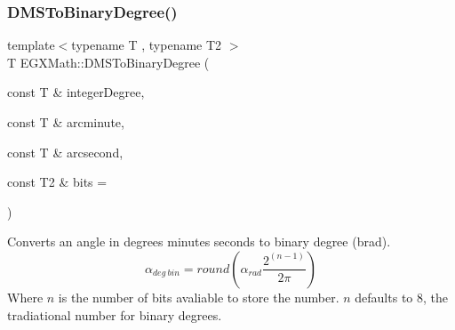 \mbox{\label{group___e_g_x_math-_angle_conversions-_d_m_s_gae0b9627dc69707dd6febb80306318d9a}} 
\subsubsection{\texorpdfstring{D\+M\+S\+To\+Binary\+Degree()}{DMSToBinaryDegree()}}
{\footnotesize\ttfamily template$<$typename T , typename T2 $>$ \\
T E\+G\+X\+Math\+::\+D\+M\+S\+To\+Binary\+Degree (\begin{DoxyParamCaption}\item[{const T \&}]{integer\+Degree,  }\item[{const T \&}]{arcminute,  }\item[{const T \&}]{arcsecond,  }\item[{const T2 \&}]{bits = {} }\end{DoxyParamCaption})}



Converts an angle in degrees minutes seconds to binary degree (brad). \[\alpha_{deg\ bin}=round(\alpha_{rad}\frac{2^{(n-1)}}{2 \pi})\] Where $n$ is the number of bits avaliable to store the number. $n$ defaults to 8, the tradiational number for binary degrees. 

